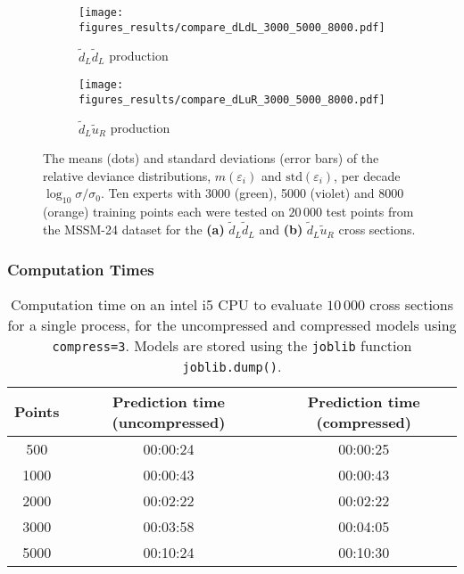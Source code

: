 \documentclass[twoside,english]{uiofysmaster}
\begin{document}
{{\begin{figure}
    \centering
    \begin{subfigure}[b]{0.9\textwidth}
        \texttt{[image: figures\_results/compare\_dLdL\_3000\_5000\_8000.pdf]}
        \caption{$\widetilde{d}_L \widetilde{d}_L$ production}
        \label{Fig:: results : RD MSSM-24 uLuL experts}
    \end{subfigure}
    \begin{subfigure}[b]{0.9\textwidth}
        \texttt{[image: figures\_results/compare\_dLuR\_3000\_5000\_8000.pdf]}
        \caption{$\widetilde{d}_L\widetilde{u}_R$ production}
        \label{Fig :: results : RD MSSM-24 uLdL experts}
    \end{subfigure}
    \caption{The means (dots) and standard deviations (error bars) of the relative deviance distributions, $m(\varepsilon_i)$ and $\mathrm{std}(\varepsilon_i)$, per decade $\log_{10} \sigma / \sigma_0$. Ten experts with 3000 (green), 5000 (violet) and 8000 (orange) training points each were tested on $20\,000$ test points from the MSSM-24 dataset for the \textbf{(a)}  $\widetilde{d}_L \widetilde{d}_L$ and \textbf{(b)} $\widetilde{d}_L\widetilde{u}_R$ cross sections. }
\label{Fig:: results : RD 3000 vs 5000}
\end{figure}







\subsubsection{Computation Times}



\begin{table}
\centering
\begin{tabular}{@{}ccc@{}} \toprule
Points & Prediction time (uncompressed) & Prediction time (compressed)\\ \midrule
500 & 00:00:24 & 00:00:25\\ 
1000 & 00:00:43 & 00:00:43\\
2000 & 00:02:22 & 00:02:22\\
3000 & 00:03:58 & 00:04:05\\
5000 & 00:10:24 & 00:10:30\\ \bottomrule
\end{tabular}
\caption{Computation time on an intel i5 CPU to evaluate $10\,000$ cross sections for a single process, for the uncompressed and compressed models using {\tt compress=3}. Models are stored using the {\tt joblib} function {\tt joblib.dump()}.}
\label{Tab:: results : Computation times, uncompressed and compressed}
\end{table}

}}
\end{document}
